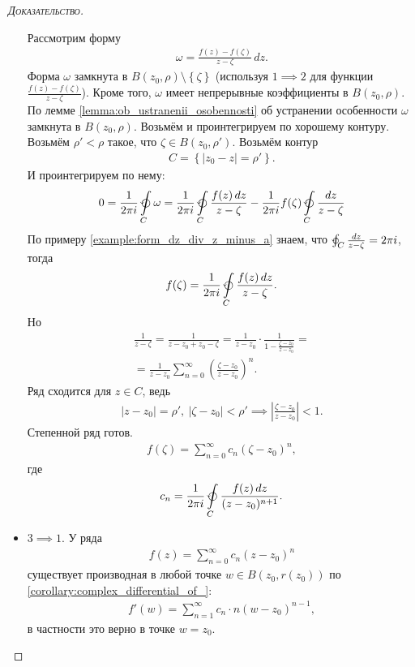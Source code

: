 \documentclass[../complex-analysis.tex]{subfiles}
\begin{document}
\begin{proof}[\normalfont\textsc{Доказательство}]
\begin{itemize}
 Рассмотрим форму
 \begin{align*}
  \omega = \frac{f(z) - f(\zeta)}{z-\zeta}\,dz.
 \end{align*} Форма $\omega$ замкнута в $B(z_0, \rho) \setminus \left\{ \zeta \right\}$ (используя $1 \implies 2$ для функции $\frac{f(z) - f(\zeta)}{z-\zeta}$). Кроме того, $\omega$ имеет непрерывные коэффициенты в $B(z_0, \rho)$. По лемме \ref{lemma:ob_ustranenii_osobennosti} об устранении особенности $\omega$ замкнута в $B(z_0, \rho)$. Возьмём и проинтегрируем по хорошему контуру. Возьмём $\rho' < \rho$ такое, что $\zeta \in B(z_0, \rho')$. Возьмём контур
 \begin{align*}
  C = \left\{ \left| z_0 - z \right| = \rho' \right\}.
 \end{align*} И проинтегрируем по нему:
 \begin{align*}
  0=\frac{1}{2\pi i} \varointctrclockwise\limits_{C} \omega  = \frac{1}{2\pi i} \varointctrclockwise\limits_{C} \frac{f(z)\,dz}{z - \zeta}  - \frac{1}{2\pi i} f(\zeta) \varointctrclockwise\limits_{C} \frac{dz}{z - \zeta} 
 \end{align*}
 По примеру \ref{example:form_dz_div_z_minus_a} знаем, что $\varointctrclockwise_{C} \frac{dz}{z - \zeta} = 2 \pi i$, тогда 
 \begin{align*}
  f(\zeta) = \frac{1}{2\pi i} \varointctrclockwise\limits_{C} \frac{f(z)\,dz}{z - \zeta}.
 \end{align*} Но
 \begin{align*}
  \frac{1}{z - \zeta} = \frac{1}{z - z_0 + z_0 - \zeta} = \frac{1}{z - z_0} \cdot \frac{1}{1 -  \frac{\zeta - z_0}{z - z_0}} = \\
  = \frac{1}{z-z_0} \sum_{n=0}^{\infty} \left( \frac{\zeta-z_0}{z-z_0} \right)^{n}.
 \end{align*} Ряд сходится для $z \in C$, ведь
 \begin{align*}
	 |z - z_0| = \rho', \ |\zeta - z_0| < \rho' \implies 
  \left| \frac{\zeta - z_0}{z-z_0} \right| < 1.
 \end{align*}
 Степенной ряд готов.
 \begin{align*}
  f(\zeta) = \sum_{n=0}^{\infty} c_n \left( \zeta - z_0 \right)^{n},
 \end{align*} где
 \begin{align*}
  c_n = \frac{1}{2\pi i} \varointctrclockwise\limits_{C} \frac{f(z)\,dz}{(z - z_0)^{n + 1}}.
 \end{align*} 

\item $ 3 \implies 1 $. У ряда 
 \begin{align*}
  f(z) = \sum_{n=0}^{\infty}c_n(z-z_0)^{n}
\end{align*} существует производная в любой точке $ w \in B(z_0, r(z_0))$ по \eqref{corollary:complex_differential_of_}:
 \begin{align*}
  f'(w) = \sum_{n=1}^{\infty} c_n \cdot n(w - z_0)^{n-1},
 \end{align*} в частности это верно в точке  $ w = z_0 $.
 

\end{itemize}
\end{proof}
\end{document}
